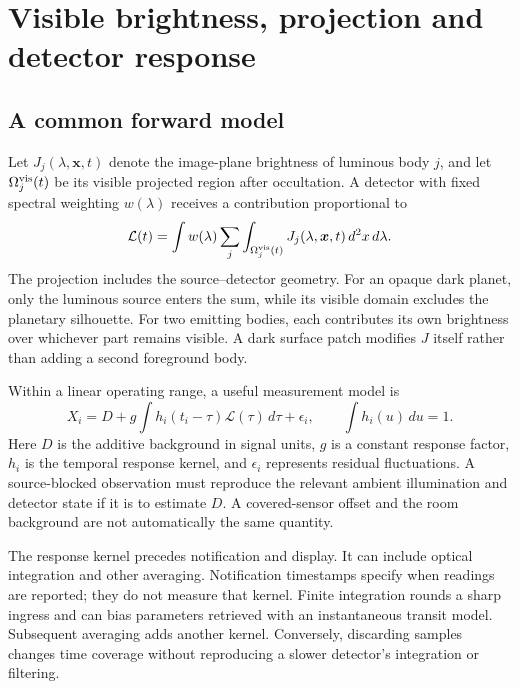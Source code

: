 \section{Visible brightness, projection and detector response}
\subsection{A common forward model}
Let $J_j(\lambda,\bm{x},t)$ denote the image-plane brightness of luminous body $j$, and let $\Omega_j^{\rm vis}(t)$ be its visible projected region after occultation. A detector with fixed spectral weighting $w(\lambda)$ receives a contribution proportional to
\begin{equation}
\mathcal{L}(t)=\int w(\lambda)\sum_j\int_{\Omega_j^{\rm vis}(t)}
J_j(\lambda,\bm{x},t)\,d^2x\,d\lambda.
\label{eq:trc-brightness}
\end{equation}
The projection includes the source--detector geometry. For an opaque dark planet, only the luminous source enters the sum, while its visible domain excludes the planetary silhouette. For two emitting bodies, each contributes its own brightness over whichever part remains visible. A dark surface patch modifies $J$ itself rather than adding a second foreground body.

Within a linear operating range, a useful measurement model is
\begin{equation}
X_i=D+g\int h_i(t_i-\tau)\mathcal{L}(\tau)\,d\tau+\epsilon_i,
\qquad \int h_i(u)\,du=1.
\label{eq:trc-response}
\end{equation}
Here $D$ is the additive background in signal units, $g$ is a constant response factor, $h_i$ is the temporal response kernel, and $\epsilon_i$ represents residual fluctuations. A source-blocked observation must reproduce the relevant ambient illumination and detector state if it is to estimate $D$. A covered-sensor offset and the room background are not automatically the same quantity.

The response kernel precedes notification and display. It can include optical integration and other averaging. Notification timestamps specify when readings are reported; they do not measure that kernel. Finite integration rounds a sharp ingress and can bias parameters retrieved with an instantaneous transit model\cite{kipping2010}. Subsequent averaging adds another kernel. Conversely, discarding samples changes time coverage without reproducing a slower detector's integration or filtering.


